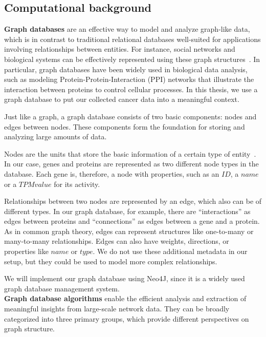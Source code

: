 \subsection{Computational background} \label{subsec:computational_background}

\textbf{Graph databases} are an effective way to model and analyze graph-like data,
which is in contrast to traditional relational databases well-suited for applications involving relationships between entities.
For instance, social networks and biological systems can be effectively represented using these graph structures~\cite{graph_db_survey}.
In particular, graph databases have been widely used in biological data analysis, such as modeling Protein-Protein-Interaction (PPI) networks
that illustrate the interaction between proteins to control cellular processes.
In this thesis, we use a graph database to put our collected cancer data into a meaningful context.

Just like a graph, a graph database consists of two basic components: nodes and edges between nodes.
These components form the foundation for storing and analyzing large amounts of data.

Nodes are the units that store the basic information of a certain type of entity~\cite{graph_db_survey}.
In our case, genes and proteins are represented as two different node types in the database.
Each gene is, therefore, a node with properties, such as an $ID$, a $name$ or a $TPM value$ for its activity.

Relationships between two nodes are represented by an edge, which also can be of different types.
In our graph database, for example, there are “interactions” as edges between proteins and “connections” as edges between a gene and a protein.
As in common graph theory, edges can represent structures like one-to-many or many-to-many relationships.
Edges can also have weights, directions, or properties like $name$ or $type$\cite{graph_db_power_limitations}.
We do not use these additional metadata in our setup, but they could be used to model more complex relationships.

We will implement our graph database using Neo4J, since it is a widely used graph database management system.
\\


\textbf{Graph database algorithms} enable the efficient analysis and extraction of meaningful insights from large-scale network data.
They can be broadly categorized into three primary groups, which provide different perspectives on graph structure.


